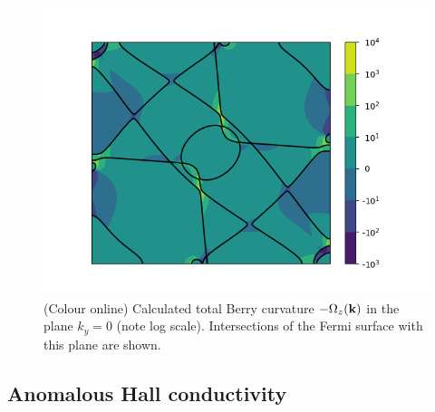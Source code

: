 \begin{figure}[b!]
\centering
\includegraphics[width=0.5\columnwidth]{figure/example18/Fe_Fermi_surface+Berry_phase.png}
\caption{(Colour online) Calculated total Berry curvature $-\Omega_z(\bfk)$ in the plane $k_y=0$ (note log scale). Intersections of the Fermi surface
with this plane are shown.}\label{fig18.3}
\end{figure}

\subsection*{Anomalous Hall conductivity}

